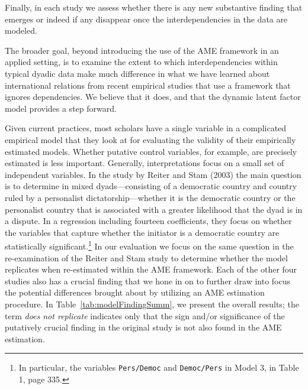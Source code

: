 Finally, in each study we assess whether there is any new substantive finding that emerges or indeed if any disappear once the interdependencies in the data are modeled.

The broader goal, beyond introducing the use of the AME framework in an applied setting, is to examine the extent to which interdependencies within typical dyadic data make much difference in what we have learned about international relations from recent empirical studies that use a framework that ignores dependencies.  We believe that it does, and that the dynamic latent factor model provides a step forward.

Given current practices, most scholars have a single variable in a complicated empirical model that they look at for evaluating the validity of their empirically estimated models.  Whether putative control variables, for example, are precisely estimated is less important. Generally, interpretations focus on a small set of independent variables.  In the study by Reiter and Stam (2003) the main question is to determine in mixed dyads---consisting of a democratic country and country ruled by a personalist dictatorship---whether it is the
democratic country or the personalist country that is associated with a greater likelihood that the dyad is in a dispute.  In a regression including fourteen coefficients, they focus on whether the variables that capture whether the initiator is a democratic country are statistically significant.\footnote{In particular, the variables \texttt{Pers/Democ} and \texttt{Democ/Pers} in Model 3, in Table 1, page 335.} In our evaluation we focus on the same question in the re-examination of the Reiter and Stam study to determine whether the model replicates when re-estimated within the AME framework. Each of the other four studies also has a crucial finding that we hone in on to further draw into focus the potential differences brought about by utilizing an AME estimation procedure.  In Table~\ref{tab:modelFindingSumm}, we present the overall results; the term \textit{does not replicate} indicates only that the sign and/or significance of the putatively crucial finding in the original study is not also found in the AME estimation.

